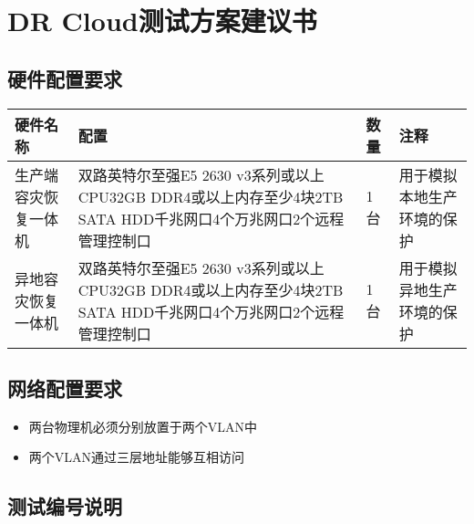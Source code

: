 \chapter{DR Cloud测试方案建议书}
\label{drcloud测试方案建议书}

\section{硬件配置要求}
\label{硬件配置要求}

\begin{table}[htbp]
\begin{minipage}{\linewidth}
\setlength{\tymax}{0.5\linewidth}
\centering
\small
\begin{tabulary}{\textwidth}{@{}LLLL@{}} \toprule
硬件名称&配置&数量&注释\\
\midrule
生产端容灾恢复一体机&双路英特尔至强E5 2630 v3系列或以上CPU32GB DDR4或以上内存至少4块2TB SATA HDD千兆网口4个万兆网口2个远程管理控制口&1台&用于模拟本地生产环境的保护\\
异地容灾恢复一体机&双路英特尔至强E5 2630 v3系列或以上CPU32GB DDR4或以上内存至少4块2TB SATA HDD千兆网口4个万兆网口2个远程管理控制口&1台&用于模拟异地生产环境的保护\\

\bottomrule

\end{tabulary}
\end{minipage}
\end{table}

\section{网络配置要求}
\label{网络配置要求}

\begin{itemize}
\item 两台物理机必须分别放置于两个VLAN中

\item 两个VLAN通过三层地址能够互相访问

\end{itemize}

\section{测试编号说明}
\label{测试编号说明}

